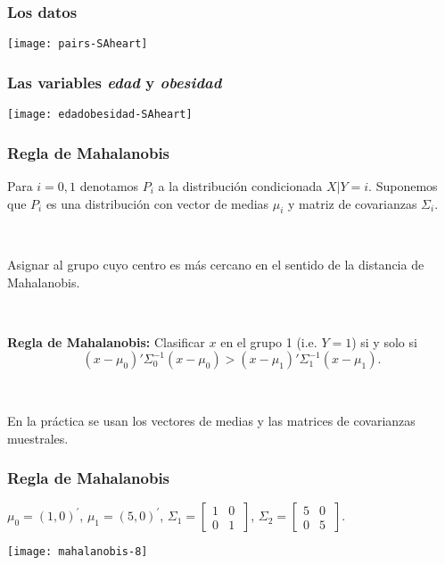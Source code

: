 \documentclass{beamer}
\begin{document}
\begin{frame}
\frametitle{Los datos}

\centerline{\texttt{[image: pairs-SAheart]}}

\end{frame}
\begin{frame}
\frametitle{Las variables \textit{edad} y \textit{obesidad}}

\centerline{\texttt{[image: edadobesidad-SAheart]}}

\end{frame}
\begin{frame}[plain]
\frametitle{Regla de Mahalanobis}

Para $i=0,1$ denotamos $P_i$  a la distribución condicionada  $X|Y=i$. Suponemos que $P_i$ es una distribución con vector de medias $\mu_i$ y matriz de covarianzas $\Sigma_i$.




\

Asignar al grupo cuyo centro es más cercano en el sentido de la distancia de Mahalanobis.

\

\textbf{Regla de Mahalanobis:} Clasificar $x$ en el grupo 1 (i.e. $Y=1$) si y solo si
\[
(x-\mu_0)'\Sigma_0^{-1}(x-\mu_0) >  (x-\mu_1)'\Sigma_1^{-1}(x-\mu_1).
\]

\

En la práctica se usan los vectores de medias y las matrices de covarianzas muestrales. 


\end{frame}
\begin{frame}
 \frametitle{Regla de Mahalanobis}

\centerline{$\mu_0=(1,0)^\prime$, $\mu_1=
(5,0)^\prime$, $\Sigma_1=\left[
  \begin{array}{cc}
    1 & 0 \\
    0 & 1 \
  \end{array} \right]$,
$\Sigma_2=\left[
  \begin{array}{cc}
    5 & 0 \\
    0 & 5 \
  \end{array} \right]$.}

\centerline{{\texttt{[image: mahalanobis-8]}}}




\end{frame}
\end{document}
